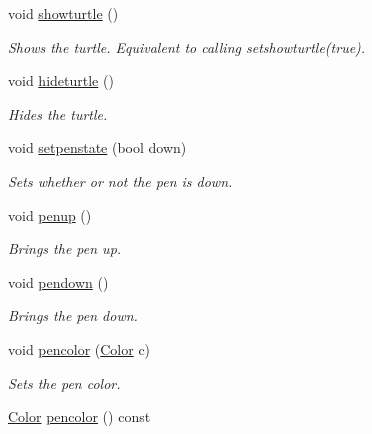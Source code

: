 \begin{DoxyCompactItemize}
void \hyperlink{classcturtle_1_1Turtle_ac676ff53f6393c70d665053cab1d67c5}{showturtle} ()
\begin{DoxyCompactList}\small\item\em Shows the turtle. Equivalent to calling setshowturtle(true). \end{DoxyCompactList}\item 
void \hyperlink{classcturtle_1_1Turtle_a9703e6352bb71bb995ad0d364be66a49}{hideturtle} ()
\begin{DoxyCompactList}\small\item\em Hides the turtle. \end{DoxyCompactList}\item 
\mbox{\label{classcturtle_1_1Turtle_abaa5b7f8b659975bcfc9a787a93c123d}} 
void \hyperlink{classcturtle_1_1Turtle_abaa5b7f8b659975bcfc9a787a93c123d}{setpenstate} (bool down)
\begin{DoxyCompactList}\small\item\em Sets whether or not the pen is down. \end{DoxyCompactList}\item 
\mbox{\label{classcturtle_1_1Turtle_a2ee85233603aac7e5e6bd9ede80d2970}} 
void \hyperlink{classcturtle_1_1Turtle_a2ee85233603aac7e5e6bd9ede80d2970}{penup} ()
\begin{DoxyCompactList}\small\item\em Brings the pen up. \end{DoxyCompactList}\item 
\mbox{\label{classcturtle_1_1Turtle_a8256411dae140f1e09058afecf7e6e8e}} 
void \hyperlink{classcturtle_1_1Turtle_a8256411dae140f1e09058afecf7e6e8e}{pendown} ()
\begin{DoxyCompactList}\small\item\em Brings the pen down. \end{DoxyCompactList}\item 
void \hyperlink{classcturtle_1_1Turtle_a9fb220cdbffecdaaa8f8a722ef624eb8}{pencolor} (\hyperlink{classcturtle_1_1Color}{Color} c)
\begin{DoxyCompactList}\small\item\em Sets the pen color. \end{DoxyCompactList}\item 
\hyperlink{classcturtle_1_1Color}{Color} \hyperlink{classcturtle_1_1Turtle_ab14dd65bd0e882b815755656072a9cdd}{pencolor} () const

\end{DoxyCompactItemize}
